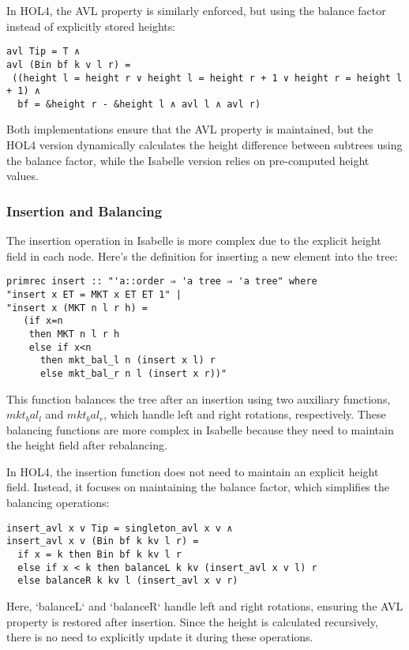 \documentclass[12pt]{article}
\begin{document}
In HOL4, the AVL property is similarly enforced, but using the balance factor instead of explicitly stored heights:

\begin{verbatim}
avl Tip = T ∧
avl (Bin bf k v l r) =
 ((height l = height r ∨ height l = height r + 1 ∨ height r = height l + 1) ∧
  bf = &height r - &height l ∧ avl l ∧ avl r)
\end{verbatim}

Both implementations ensure that the AVL property is maintained, but the HOL4 version dynamically calculates the height difference between subtrees using the balance factor, while the Isabelle version relies on pre-computed height values.

\subsubsection{Insertion and Balancing}

The insertion operation in Isabelle is more complex due to the explicit height field in each node. Here’s the definition for inserting a new element into the tree:

\begin{verbatim}
primrec insert :: "'a::order ⇒ 'a tree ⇒ 'a tree" where
"insert x ET = MKT x ET ET 1" |
"insert x (MKT n l r h) = 
   (if x=n
    then MKT n l r h
    else if x<n
      then mkt_bal_l n (insert x l) r
      else mkt_bal_r n l (insert x r))"
\end{verbatim}

This function balances the tree after an insertion using two auxiliary functions, \(mkt_bal_l\) and \(mkt_bal_r\), which handle left and right rotations, respectively. These balancing functions are more complex in Isabelle because they need to maintain the height field after rebalancing.

In HOL4, the insertion function does not need to maintain an explicit height field. Instead, it focuses on maintaining the balance factor, which simplifies the balancing operations:

\begin{verbatim}
insert_avl x v Tip = singleton_avl x v ∧  
insert_avl x v (Bin bf k kv l r) =
  if x = k then Bin bf k kv l r  
  else if x < k then balanceL k kv (insert_avl x v l) r  
  else balanceR k kv l (insert_avl x v r)
\end{verbatim}

Here, `balanceL` and `balanceR` handle left and right rotations, ensuring the AVL property is restored after insertion. Since the height is calculated recursively, there is no need to explicitly update it during these operations.
\end{document}
